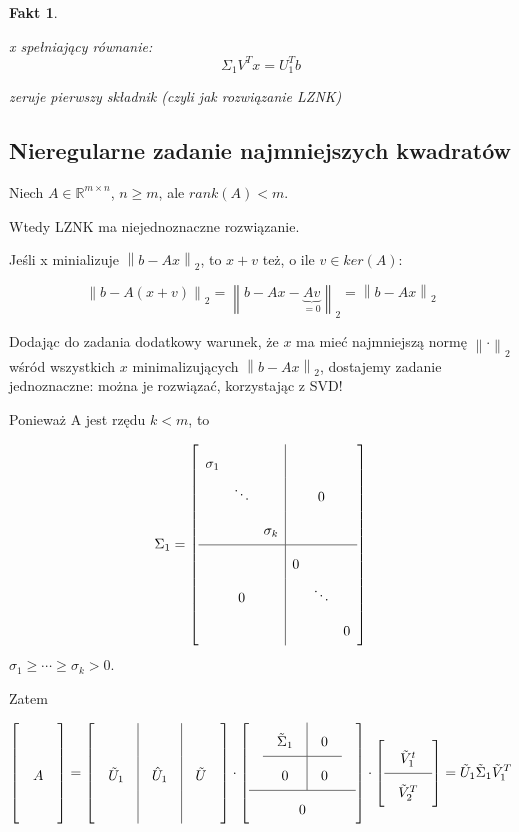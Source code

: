 \documentclass[hidelinks,a4paper]{article}
\newcommand{\RR}{\mathbb{R}}
\newcommand{\norm}[1]{\left\lVert#1\right\rVert}
\newtheorem{fakt}{Fakt}
\begin{document}
\begin{fakt}
\begin{enumerate}
		      x spełniający równanie:
		      \[
		      	\Sigma_1V^Tx = U_1^Tb
		      \]
		      
		      zeruje pierwszy składnik (czyli jak rozwiązanie LZNK)
	\end{enumerate}
\end{fakt}

\subsection{Nieregularne zadanie najmniejszych kwadratów}

Niech $A \in \RR^{m \times n}$, $n \geq m$, ale $rank(A) < m$.

Wtedy LZNK ma niejednoznaczne rozwiązanie.

Jeśli x minializuje $\norm{b - Ax}_2$, to $x+v$ też, o ile $v \in ker(A)$:

\[
	\norm{b - A(x + v)}_2 = \norm{b - Ax - \underbrace{Av}_{=0}}_2 = \norm{b - Ax}_2
\]

Dodając do zadania dodatkowy warunek, że $x$ ma mieć najmniejszą normę $\norm{\cdot}_2$ wśród wszystkich $x$ minimalizujących $\norm{b - Ax}_2$, dostajemy zadanie jednoznaczne: można je rozwiązać, korzystając z SVD!

Ponieważ A jest rzędu $k<m$, to 

\[
	\Sigma_1 = \left[ \begin{array}{ccc|ccc}
		\sigma_1 &  &  &  &  & \\ 
		&  \ddots &  &  & 0  & \\ 
		&  & \sigma_k  &  &  & \\ 
		\hline
		&  & &  0 &  & \\ 
		&  0 &  &  & \ddots & \\ 
		&  &  &  &  & 0
	\end{array} \right]
\]
$\sigma_1 \geq \cdots \geq \sigma_k > 0$.

Zatem

\[\arraycolsep=1em\def\arraystretch{2}
	\left[\begin{array}{c} \\ A \\ \ \end{array}\right] =
	\left[\begin{array}{c|c|c} & &\ \\ \tilde{U}_1 & \hat{U}_1 & \tilde{U} \\ & & \ \end{array}\right] \cdot \left[ \begin{array}{c} \begin{array}{c|c} \tilde{\Sigma}_1 & 0 \\ \hline 0 & 0 \end{array} \\ \hline 0\end{array}\right] \cdot \left[ \begin{array}{c} \tilde{V}_1^t \\ \hline \tilde{V}_2^T \end{array}\right] = \tilde{U}_1 \tilde{\Sigma}_1 \tilde{V}_1^T
\]
\end{document}
